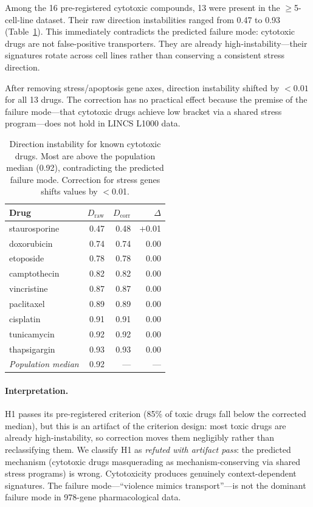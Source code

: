 \documentclass{article}
\begin{document}
Among the 16 pre-registered cytotoxic compounds, 13 were present in the
$\geq$5-cell-line dataset. Their raw direction instabilities ranged from
0.47 to 0.93 (Table~\ref{tab:toxic}). This immediately contradicts the
predicted failure mode: cytotoxic drugs are not false-positive transporters.
They are already high-instability---their signatures rotate across cell lines
rather than conserving a consistent stress direction.

After removing stress/apoptosis gene axes, direction instability shifted by
$<0.01$ for all 13 drugs. The correction has no practical effect because the
premise of the failure mode---that cytotoxic drugs achieve low bracket via
a shared stress program---does not hold in LINCS L1000 data.

\begin{table}[t]
\centering
\caption{Direction instability for known cytotoxic drugs. Most are above the
population median (0.92), contradicting the predicted failure mode.
Correction for stress genes shifts values by $<$0.01.}
\label{tab:toxic}
\small
\begin{tabular}{lrrr}
\toprule
Drug & $D_{\text{raw}}$ & $D_{\text{corr}}$ & $\Delta$ \\
\midrule
staurosporine & 0.47 & 0.48 & $+$0.01 \\
doxorubicin & 0.74 & 0.74 & 0.00 \\
etoposide & 0.78 & 0.78 & 0.00 \\
camptothecin & 0.82 & 0.82 & 0.00 \\
vincristine & 0.87 & 0.87 & 0.00 \\
paclitaxel & 0.89 & 0.89 & 0.00 \\
cisplatin & 0.91 & 0.91 & 0.00 \\
tunicamycin & 0.92 & 0.92 & 0.00 \\
thapsigargin & 0.93 & 0.93 & 0.00 \\
\midrule
\emph{Population median} & 0.92 & --- & --- \\
\bottomrule
\end{tabular}
\end{table}

\paragraph{Interpretation.}
H1 passes its pre-registered criterion (85\% of toxic drugs fall below
the corrected median), but this is an artifact of the criterion design: most
toxic drugs are already high-instability, so correction moves them
negligibly rather than reclassifying them. We classify H1 as
\emph{refuted with artifact pass}: the predicted mechanism (cytotoxic
drugs masquerading as mechanism-conserving via shared stress programs) is
wrong. Cytotoxicity produces genuinely context-dependent signatures.
The failure mode---``violence mimics transport''---is not the dominant
failure mode in 978-gene pharmacological data.
\end{document}
